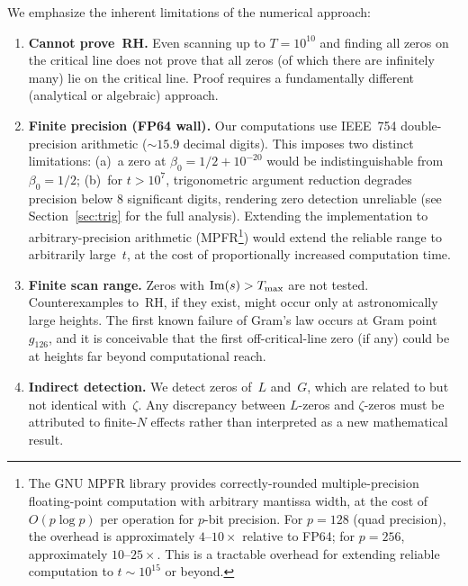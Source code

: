 We emphasize the inherent limitations of the numerical approach:
\begin{enumerate}
  \item \textbf{Cannot prove~RH.} Even scanning up to $T = 10^{10}$ and finding all zeros
        on the critical line does not prove that all zeros (of which there are infinitely
        many) lie on the critical line. Proof requires a fundamentally different
        (analytical or algebraic) approach.

  \item \textbf{Finite precision (FP64 wall).} Our computations use IEEE~754
        double-precision arithmetic ($\sim 15.9$ decimal digits). This imposes two
        distinct limitations: (a)~a zero at $\beta_0 = 1/2 + 10^{-20}$ would be
        indistinguishable from $\beta_0 = 1/2$; (b)~for $t > 10^7$, trigonometric
        argument reduction degrades precision below $8$ significant digits, rendering
        zero detection unreliable (see Section~\ref{sec:trig} for the full analysis).
        Extending the implementation to arbitrary-precision arithmetic
        (MPFR\footnote{The GNU MPFR library provides correctly-rounded multiple-precision
        floating-point computation with arbitrary mantissa width, at the cost of
        $O(p\log p)$ per operation for $p$-bit precision. For $p = 128$ (quad precision),
        the overhead is approximately $4$--$10\times$ relative to FP64; for $p = 256$,
        approximately $10$--$25\times$. This is a tractable overhead for extending
        reliable computation to $t \sim 10^{15}$ or beyond.}) would extend the reliable
        range to arbitrarily large~$t$, at the cost of proportionally increased
        computation time.

  \item \textbf{Finite scan range.} Zeros with $\operatorname{Im}(s) > T_{\max}$ are not tested.
        Counterexamples to~RH, if they exist, might occur only at astronomically large
        heights. The first known failure of Gram's law occurs at Gram point $g_{126}$,
        and it is conceivable that the first off-critical-line zero (if any) could be at
        heights far beyond computational reach.

  \item \textbf{Indirect detection.} We detect zeros of~$L$ and~$G$, which are related
        to but not identical with~$\zeta$. Any discrepancy between $L$-zeros and
        $\zeta$-zeros must be attributed to finite-$N$ effects rather than interpreted as
        a new mathematical result.
\end{enumerate}
